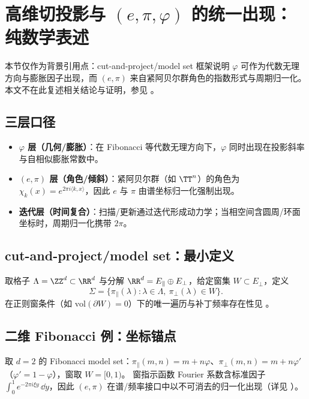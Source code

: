 \section{高维切投影与 \texorpdfstring{$(e,\pi,\varphi)$}{(e, pi, varphi)} 的统一出现：纯数学表述}\label{sec:high-dimensional-cut-project}

本节仅作为背景引用点：cut-and-project/model set 框架说明 \(\varphi\) 可作为代数无理方向与膨胀因子出现，而 \((e,\pi)\) 来自紧阿贝尔群角色的指数形式与周期归一化。本文不在此复述相关结论与证明，参见 \cite{BaakeGrimmAperiodicOrder1,MeyerAlgebraicNumbers,QueffelecSubstitution}。

\subsection{三层口径}\label{subsec:three-layer-epi-phi}
\begin{itemize}
  \item \textbf{\(\varphi\) 层（几何/膨胀）}：在 Fibonacci 等代数无理方向下，\(\varphi\) 同时出现在投影斜率与自相似膨胀常数中。
  \item \textbf{\((e,\pi)\) 层（角色/倾斜）}：紧阿贝尔群（如 \(\TT^n\)）的角色为 \(\chi_k(x)=e^{2\pi i\langle k,x\rangle}\)，因此 \(e\) 与 \(\pi\) 由谱坐标归一化强制出现。
  \item \textbf{迭代层（时间复合）}：扫描/更新通过迭代形成动力学；当相空间含圆周/环面坐标时，周期归一化携带 \(2\pi\)。
\end{itemize}

\subsection{cut-and-project/model set：最小定义}
取格子 \(\Lambda=\ZZ^d\subset\RR^d\) 与分解 \(\RR^d=E_{\parallel}\oplus E_{\perp}\)，给定窗集 \(W\subset E_{\perp}\)，定义
\[
\Sigma=\{\pi_{\parallel}(\lambda):\lambda\in\Lambda,\ \pi_{\perp}(\lambda)\in W\}.
\]
在正则窗条件（如 \(\mathrm{vol}(\partial W)=0\)）下的唯一遍历与补丁频率存在性见 \cite{BaakeGrimmAperiodicOrder1,MeyerAlgebraicNumbers}。

\subsection{二维 Fibonacci 例：坐标锚点}\label{subsec:fib-model-set-e-pi-phi}
取 \(d=2\) 的 Fibonacci model set：\(\pi_{\parallel}(m,n)=m+n\varphi\)、\(\pi_{\perp}(m,n)=m+n\varphi'\)（\(\varphi'=1-\varphi\)），窗取 \(W=[0,1)\)。
窗指示函数 Fourier 系数含标准因子 \(\int_0^1 e^{-2\pi i\xi y}\,\dd y\)，因此 \((e,\pi)\) 在谱/频率接口中以不可消去的归一化出现（详见 \cite{BaakeGrimmAperiodicOrder1,MeyerAlgebraicNumbers}）。
